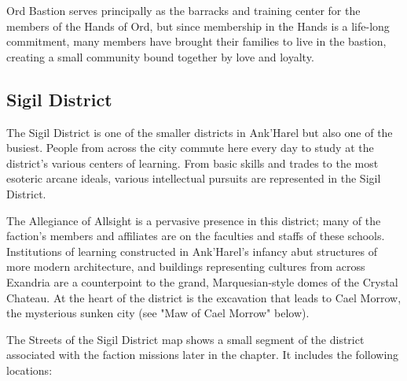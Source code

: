 \documentclass[10pt,a4paper,twoside,bg=print,twocolumn,openany,nodeprecatedcode]{dndbook}
\begin{document}
Ord Bastion serves principally as the barracks and training center for the members of the Hands of Ord, but since membership in the Hands is a life-long commitment, many members have brought their families to live in the bastion, creating a small community bound together by love and loyalty.




\subsection{Sigil District}
The Sigil District is one of the smaller districts in Ank'Harel but also one of the busiest. People from across the city commute here every day to study at the district's various centers of learning. From basic skills and trades to the most esoteric arcane ideals, various intellectual pursuits are represented in the Sigil District.

The Allegiance of Allsight is a pervasive presence in this district; many of the faction's members and affiliates are on the faculties and staffs of these schools. Institutions of learning constructed in Ank'Harel's infancy abut structures of more modern architecture, and buildings representing cultures from across Exandria are a counterpoint to the grand, Marquesian-style domes of the Crystal Chateau. At the heart of the district is the excavation that leads to Cael Morrow, the mysterious sunken city (see "Maw of Cael Morrow" below).

The Streets of the Sigil District map shows a small segment of the district associated with the faction missions later in the chapter. It includes the following locations:
\end{document}
